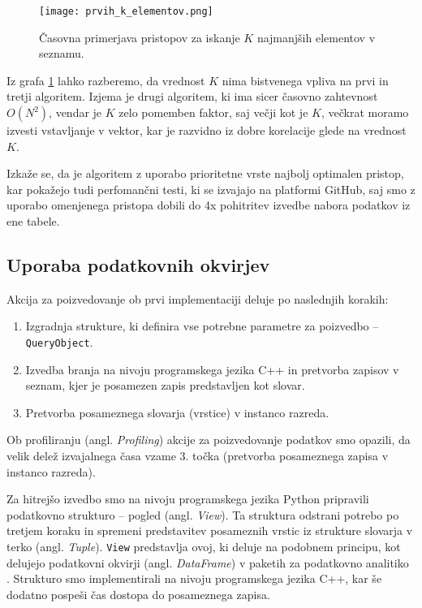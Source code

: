 \documentclass[a4paper,12pt,openright]{book}
\begin{document}
        \begin{figure}[H]
            \centerline{\texttt{[image: prvih\_k\_elementov.png]}}
            \caption{Časovna primerjava pristopov za iskanje $K$ najmanjših elementov v seznamu.}
            \label{sl:k_smallest}
        \end{figure}

        \noindent
        Iz grafa \ref{sl:k_smallest} lahko razberemo, da vrednost $K$ nima bistvenega vpliva na prvi in tretji algoritem. Izjema je drugi algoritem, ki ima sicer časovno zahtevnost $O(N^2)$, vendar je $K$ zelo pomemben faktor, saj večji kot je $K$, večkrat moramo izvesti vstavljanje v vektor, kar je razvidno iz dobre korelacije glede na vrednost $K$.

        Izkaže se, da je algoritem z uporabo prioritetne vrste najbolj optimalen pristop, kar pokažejo tudi perfomančni testi, ki se izvajajo na platformi GitHub, saj smo z uporabo omenjenega pristopa dobili do 4x pohitritev izvedbe nabora podatkov iz ene tabele.

        \newpage
        \subsection{Uporaba podatkovnih okvirjev}
        \label{using_df}

        Akcija za poizvedovanje ob prvi implementaciji deluje po naslednjih korakih:
        \begin{enumerate}
            \item Izgradnja strukture, ki definira vse potrebne parametre za poizvedbo – {\tt QueryObject}.
            \item Izvedba branja na nivoju programskega jezika C++ in pretvorba zapisov v seznam, kjer je posamezen zapis predstavljen kot slovar.
            \item Pretvorba posameznega slovarja (vrstice) v instanco razreda.
        \end{enumerate}

        \noindent
        Ob profiliranju (angl. \textit{Profiling}) akcije za poizvedovanje podatkov smo opazili, da velik delež izvajalnega časa vzame 3. točka  (pretvorba posameznega zapisa v instanco razreda).

        Za hitrejšo izvedbo smo na nivoju programskega jezika Python pripravili podatkovno strukturo – pogled (angl. \textit{View}). Ta struktura odstrani potrebo po tretjem koraku in spremeni predstavitev posameznih vrstic iz strukture slovarja v terko (angl. \textit{Tuple}). {\tt View} predstavlja ovoj, ki deluje na podobnem principu, kot delujejo podatkovni okvirji (angl. \textit{DataFrame}) v paketih za podatkovno analitiko \cite{mckinney2010data}. Strukturo smo implementirali na nivoju programskega jezika C++, kar še dodatno pospeši čas dostopa do posameznega zapisa.
\end{document}
